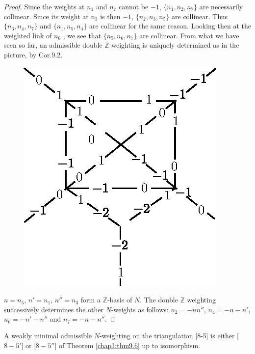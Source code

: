 \begin{proof}
Since the weights at
$n_1$ and $n_7$ cannot be $-1$, $\{ n_1, n_2, n_7 \}$ are necessarily
collinear. Since its weight at $n_3$ is then $-1$, $\{ n_2, n_3, n_5
\}$ are collinear. Thus $\{ n_3, n_4, n_7 \}$ and $\{ n_1, n_5, n_4
\}$ are collinear for the same reason. Looking then at the weighted
link of $n_6$ , we see that $\{ n_5, n_6, n_7 \}$ are collinear. From
what we have seen so far, an admissible double $\mathbb{Z}$ weighting
is uniquely determined as in the picture, by Cor.9.2.
\begin{figure}[H]
\centering 
\includegraphics[scale=0.8]{vol58-fig/fig58-48.eps} 
\end{figure}\pageoriginale
 $n = n_5$, $n'= n_1$, $n''= n_3$ form a $\mathbb{Z}$-basis of
$N$. The double $\mathbb{Z}$ weighting successively determines the
other $N$-weights as follows: $n_2 = -n n''$, $n_4 = -n -n'$, $n_6 =
-n' -n''$ and $n_7 = -n -n''$.  
\end{proof}

\begin{lemma}\label{chap1:lem9.14}
A weakly minimal admissible $N$-weighting on the triangulation [8-5]
is either [$8-5'$] or [$8-5''$] of Theorem \ref{chap1:thm9.6} up to isomorphism. 
\end{lemma}

